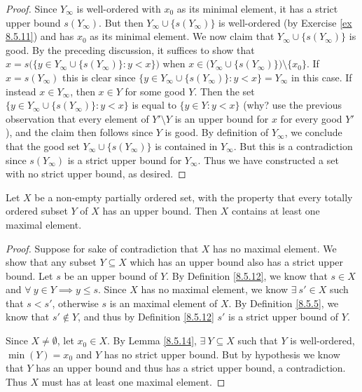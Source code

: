 \begin{proof}
    Since \(Y_{\infty}\) is well-ordered with \(x_0\) as its minimal element, it has a strict upper bound \(s(Y_{\infty})\).
    But then \(Y_{\infty} \cup \{s(Y_{\infty})\}\) is well-ordered (by Exercise \ref{ex 8.5.11}) and has \(x_0\) as its minimal element.
    We now claim that \(Y_{\infty} \cup \{s(Y_{\infty})\}\) is good.
    By the preceding discussion, it suffices to show that \(x = s\big(\big\{y \in Y_{\infty} \cup \{s(Y_{\infty})\} : y < x\big\}\big)\) when \(x \in \big(Y_{\infty} \cup \{s(Y_{\infty})\}\big) \setminus \{x_0\}\).
    If \(x = s(Y_{\infty})\) this is clear since \(\big\{y \in Y_{\infty} \cup \{s(Y_{\infty})\} : y < x\big\} = Y_{\infty}\) in this case.
    If instead \(x \in Y_{\infty}\), then \(x \in Y\) for some good \(Y\).
    Then the set \(\big\{y \in Y_{\infty} \cup \{s(Y_{\infty})\}: y < x\big\}\) is equal to \(\{y \in Y : y < x\}\)
    (why? use the previous observation that every element of \(Y' \setminus Y\) is an upper bound for \(x\) for every good \(Y'\)), and the claim then follows since \(Y\) is good.
    By definition of \(Y_{\infty}\), we conclude that the good set \(Y_{\infty} \cup \{s(Y_{\infty})\}\) is contained in \(Y_{\infty}\).
    But this is a contradiction since \(s(Y_{\infty})\) is a strict upper bound for \(Y_{\infty}\).
    Thus we have constructed a set with no strict upper bound, as desired.
\end{proof}

\begin{lemma}\label{8.5.15}
    Let \(X\) be a non-empty partially ordered set, with the property that every totally ordered subset \(Y\) of \(X\) has an upper bound.
    Then \(X\) contains at least one maximal element.
\end{lemma}

\begin{proof}
    Suppose for sake of contradiction that \(X\) has no maximal element.
    We show that any subset \(Y \subseteq X\) which has an upper bound also has a strict upper bound.
    Let \(s\) be an upper bound of \(Y\).
    By Definition \ref{8.5.12}, we know that \(s \in X\) and \(\forall\ y \in Y \implies y \leq s\).
    Since \(X\) has no maximal element, we know \(\exists\ s' \in X\) such that \(s < s'\), otherwise \(s\) is an maximal element of \(X\).
    By Definition \ref{8.5.5}, we know that \(s' \notin Y\), and thus by Definition \ref{8.5.12} \(s'\) is a strict upper bound of \(Y\).

    Since \(X \neq \emptyset\), let \(x_0 \in X\).
    By Lemma \ref{8.5.14}, \(\exists\ Y \subseteq X\) such that \(Y\) is well-ordered, \(\min(Y) = x_0\) and \(Y\) has no strict upper bound.
    But by hypothesis we know that \(Y\) has an upper bound and thus has a strict upper bound, a contradiction.
    Thus \(X\) must has at least one maximal element.
\end{proof}


